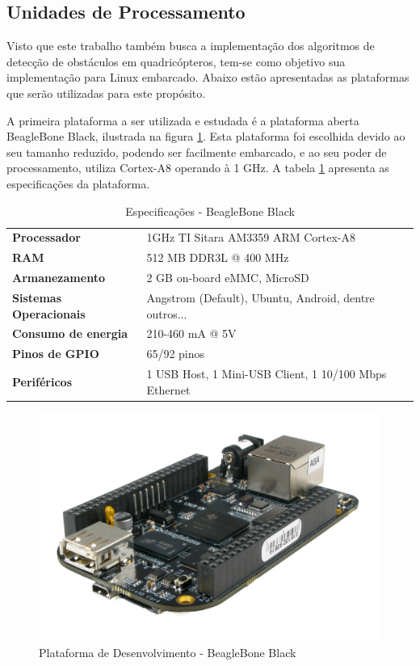 \subsection{Unidades de Processamento}

Visto que este trabalho também busca a implementação dos algoritmos de detecção de obstáculos em quadricópteros, tem-se como objetivo sua implementação para Linux embarcado. Abaixo estão apresentadas as plataformas que serão utilizadas para este propósito.

A primeira plataforma a ser utilizada e estudada é a plataforma aberta BeagleBone Black, ilustrada na figura \ref{bbb}. Esta plataforma foi escolhida devido ao seu tamanho reduzido, podendo ser facilmente embarcado, e ao seu poder de processamento, utiliza Cortex-A8 operando à 1 GHz. A tabela \ref{bbb_tab} apresenta as especificações da plataforma.

\begin{table}[]
\centering
\caption{Especificações - BeagleBone Black}
\label{bbb_tab}
\begin{tabular}{ll}
\textbf{Processador}           & 1GHz TI Sitara AM3359 ARM Cortex-A8					 \\
\textbf{RAM}                   & 512 MB DDR3L @ 400 MHz								 \\
\textbf{Armanezamento}         & 2 GB on-board eMMC, MicroSD                   		 \\
\textbf{Sistemas Operacionais} & Angstrom (Default), Ubuntu, Android, dentre outros...	 \\
\textbf{Consumo de energia}    & 210-460 mA @ 5V                                      	 \\
\textbf{Pinos de GPIO}         & 65/92 pinos                                            \\
\textbf{Periféricos}           & 1 USB Host, 1 Mini-USB Client, 1 10/100 Mbps Ethernet                                 
\end{tabular}
\end{table}

\begin{figure}[H]
 	\centering
 	\includegraphics[scale=0.10]{./Resources/bbb.jpg}
 	\caption{Plataforma de Desenvolvimento - BeagleBone Black}
 	\label{bbb}
\end{figure}

